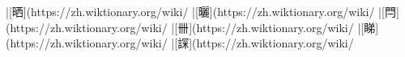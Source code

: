 |[晒](https://zh.wiktionary.org/wiki/%
|[曬](https://zh.wiktionary.org/wiki/%
|[閂](https://zh.wiktionary.org/wiki/%
|[卌](https://zh.wiktionary.org/wiki/%
|[睇](https://zh.wiktionary.org/wiki/%
|[𧨾](https://zh.wiktionary.org/wiki/%

